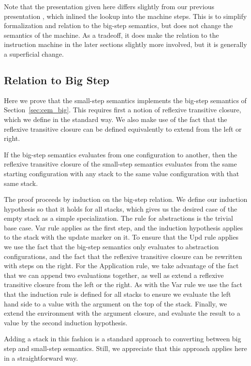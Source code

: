 Note that the presentation given here differs slightly from our previous
presentation \cite{cem}, which inlined the lookup into the machine steps. This
is to simplify formalization and relation to the big-step semantics, but does not
change the semantics of the machine. As a tradeoff, it does make the relation to
the instruction machine in the later sections slightly more involved, but
it is generally a superficial change.

\subsection{Relation to Big Step}
Here we prove that the small-step semantics implements the big-step semantics of
Section~\ref{sec:cem_big}. This requires first a notion of reflexive transitive closure,
which we define in the standard way. We also make use of the fact that the
reflexive transitive closure can be defined equivalently to extend from the left
or right. 

\begin{lemma}
If the big-step semantics evaluates from one configuration to another, then the
reflexive transitive closure of the small-step semantics evaluates from the same
starting configuration with any stack to the same value configuration with that
same stack.
\end{lemma}
\begin{proofoutline}
The proof proceeds by induction on the big-step relation. We define our
induction hypothesis so that it holds for all stacks, which gives us the
desired case of the empty stack as a simple specialization. The rule for
abstractions is the trivial base case. Var rule applies as the first step, and
the induction hypothesis applies to the stack with the update marker on it. To
ensure that the Upd rule applies we use the fact that the big-step semantics
only evaluates to abstraction configurations, and the fact that the reflexive
transitive closure can be rewritten with steps on the right. For the Application
rule, we take advantage of the fact that we can append two evaluations together,
as well as extend a reflexive transitive closure from the left or the right. As
with the Var rule we use the fact that the induction rule is defined for all
stacks to ensure we evaluate the left hand side to a value with the argument on
the top of the stack.  Finally, we extend the environment with the argument
closure, and evaluate the result to a value by the second induction hypothesis.
\end{proofoutline}

Adding a stack in this fashion is a standard approach to converting between big
step and small-step semantics. Still, we appreciate that this approach applies
here in a straightforward way. 
